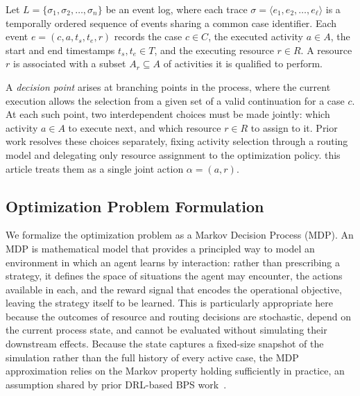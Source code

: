 \documentclass[runningheads]{llncs}
\begin{document}
Let $L=\{\sigma_1,\sigma_2,\dots,\sigma_n\}$ be an event log, where each
trace $\sigma=\langle e_1,e_2,\dots,e_\ell\rangle$ is a temporally ordered
sequence of events sharing a common case identifier. Each event
$e=(c,a,t_s,t_e,r)$ records the case $c\in C$, the executed activity $a\in A$,
the start and end timestamps $t_s,t_e\in T$, and the executing resource
$r\in R$. A resource $r$ is associated with a subset $A_r\subseteq A$ of
activities it is qualified to perform.

A \emph{decision point} arises at branching points in the process, where the
current execution allows the selection from a given set of a valid continuation for a case $c$. 
At each such point, two interdependent choices must be made jointly: which activity
$a\in A$ to execute next, and which resource $r\in R$ to assign to it. Prior
work resolves these choices separately, fixing activity selection through a
routing model and delegating only resource assignment to the optimization
policy. this article treats them as a single joint action $\alpha=(a,r)$.

\subsection{Optimization Problem Formulation}
\label{subsec:mdp_formulation}

We formalize the optimization problem as a Markov Decision Process (MDP). 
An MDP is mathematical model that provides a principled way to model an environment
in which an agent learns by interaction: rather than prescribing a strategy, 
it defines the space of situations the agent may encounter, the actions available in each,
and the reward signal that encodes the operational objective, leaving the strategy
itself to be learned. This is particularly appropriate here because the
outcomes of resource and routing decisions are stochastic, depend on the
current process state, and cannot be evaluated without simulating their
downstream effects. Because the state captures a fixed-size snapshot of the
simulation rather than the full history of every active case, the MDP
approximation relies on the Markov property holding sufficiently in
practice, an assumption shared by prior DRL-based BPS
work~\cite{Optimizing_Resource_Allocation_Policies, Learning_policies_drl}.
\end{document}
